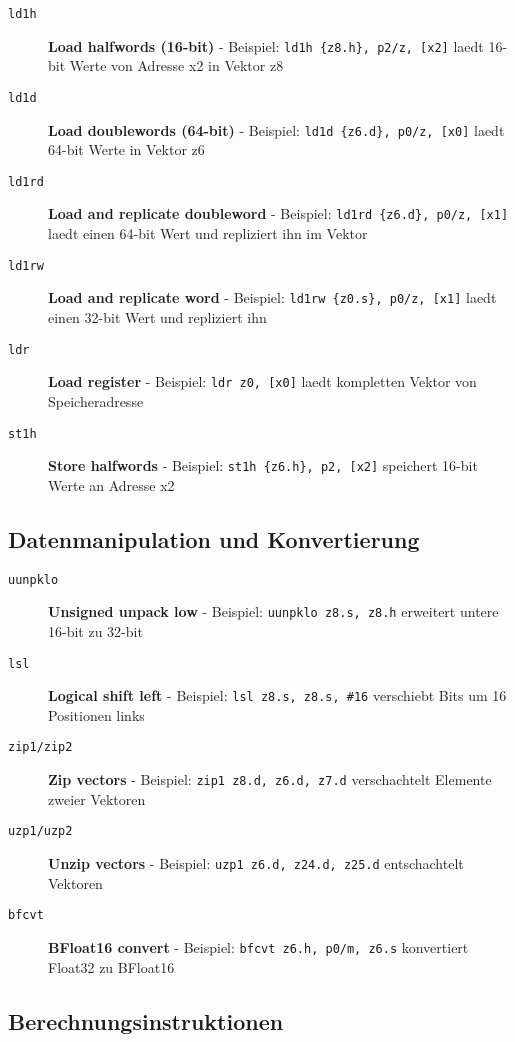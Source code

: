 \documentclass[11pt,a4paper]{article}
\begin{document}
\begin{description}
\item[\texttt{ld1h}] \textbf{Load halfwords (16-bit)} - Beispiel: \texttt{ld1h \{z8.h\}, p2/z, [x2]} laedt 16-bit Werte von Adresse x2 in Vektor z8
\item[\texttt{ld1d}] \textbf{Load doublewords (64-bit)} - Beispiel: \texttt{ld1d \{z6.d\}, p0/z, [x0]} laedt 64-bit Werte in Vektor z6
\item[\texttt{ld1rd}] \textbf{Load and replicate doubleword} - Beispiel: \texttt{ld1rd \{z6.d\}, p0/z, [x1]} laedt einen 64-bit Wert und repliziert ihn im Vektor
\item[\texttt{ld1rw}] \textbf{Load and replicate word} - Beispiel: \texttt{ld1rw \{z0.s\}, p0/z, [x1]} laedt einen 32-bit Wert und repliziert ihn
\item[\texttt{ldr}] \textbf{Load register} - Beispiel: \texttt{ldr z0, [x0]} laedt kompletten Vektor von Speicheradresse
\item[\texttt{st1h}] \textbf{Store halfwords} - Beispiel: \texttt{st1h \{z6.h\}, p2, [x2]} speichert 16-bit Werte an Adresse x2
\end{description}

\subsection{Datenmanipulation und Konvertierung}

\begin{description}
\item[\texttt{uunpklo}] \textbf{Unsigned unpack low} - Beispiel: \texttt{uunpklo z8.s, z8.h} erweitert untere 16-bit zu 32-bit
\item[\texttt{lsl}] \textbf{Logical shift left} - Beispiel: \texttt{lsl z8.s, z8.s, \#16} verschiebt Bits um 16 Positionen links
\item[\texttt{zip1/zip2}] \textbf{Zip vectors} - Beispiel: \texttt{zip1 z8.d, z6.d, z7.d} verschachtelt Elemente zweier Vektoren
\item[\texttt{uzp1/uzp2}] \textbf{Unzip vectors} - Beispiel: \texttt{uzp1 z6.d, z24.d, z25.d} entschachtelt Vektoren
\item[\texttt{bfcvt}] \textbf{BFloat16 convert} - Beispiel: \texttt{bfcvt z6.h, p0/m, z6.s} konvertiert Float32 zu BFloat16
\end{description}

\subsection{Berechnungsinstruktionen}
\end{document}
